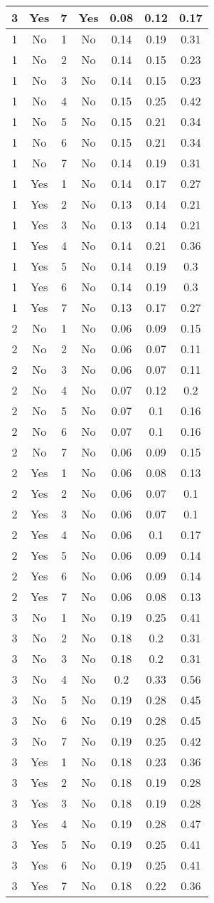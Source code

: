 \begin{table}
\begin{tabular}{|c|c|c|c|c|c|c|}
\hline 
3 & Yes & 7 & Yes & 0.08 & 0.12 & 0.17\tabularnewline
\hline 
1 & No & 1 & No & 0.14 & 0.19 & 0.31\tabularnewline
\hline 
1 & No & 2 & No & 0.14 & 0.15 & 0.23\tabularnewline
\hline 
1 & No & 3 & No & 0.14 & 0.15 & 0.23\tabularnewline
\hline 
1 & No & 4 & No & 0.15 & 0.25 & 0.42\tabularnewline
\hline 
1 & No & 5 & No & 0.15 & 0.21 & 0.34\tabularnewline
\hline 
1 & No & 6 & No & 0.15 & 0.21 & 0.34\tabularnewline
\hline 
1 & No & 7 & No & 0.14 & 0.19 & 0.31\tabularnewline
\hline 
1 & Yes & 1 & No & 0.14 & 0.17 & 0.27\tabularnewline
\hline 
1 & Yes & 2 & No & 0.13 & 0.14 & 0.21\tabularnewline
\hline 
1 & Yes & 3 & No & 0.13 & 0.14 & 0.21\tabularnewline
\hline 
1 & Yes & 4 & No & 0.14 & 0.21 & 0.36\tabularnewline
\hline 
1 & Yes & 5 & No & 0.14 & 0.19 & 0.3\tabularnewline
\hline 
1 & Yes & 6 & No & 0.14 & 0.19 & 0.3\tabularnewline
\hline 
1 & Yes & 7 & No & 0.13 & 0.17 & 0.27\tabularnewline
\hline 
2 & No & 1 & No & 0.06 & 0.09 & 0.15\tabularnewline
\hline 
2 & No & 2 & No & 0.06 & 0.07 & 0.11\tabularnewline
\hline 
2 & No & 3 & No & 0.06 & 0.07 & 0.11\tabularnewline
\hline 
2 & No & 4 & No & 0.07 & 0.12 & 0.2\tabularnewline
\hline 
2 & No & 5 & No & 0.07 & 0.1 & 0.16\tabularnewline
\hline 
2 & No & 6 & No & 0.07 & 0.1 & 0.16\tabularnewline
\hline 
2 & No & 7 & No & 0.06 & 0.09 & 0.15\tabularnewline
\hline 
2 & Yes & 1 & No & 0.06 & 0.08 & 0.13\tabularnewline
\hline 
2 & Yes & 2 & No & 0.06 & 0.07 & 0.1\tabularnewline
\hline 
2 & Yes & 3 & No & 0.06 & 0.07 & 0.1\tabularnewline
\hline 
2 & Yes & 4 & No & 0.06 & 0.1 & 0.17\tabularnewline
\hline 
2 & Yes & 5 & No & 0.06 & 0.09 & 0.14\tabularnewline
\hline 
2 & Yes & 6 & No & 0.06 & 0.09 & 0.14\tabularnewline
\hline 
2 & Yes & 7 & No & 0.06 & 0.08 & 0.13\tabularnewline
\hline 
3 & No & 1 & No & 0.19 & 0.25 & 0.41\tabularnewline
\hline 
3 & No & 2 & No & 0.18 & 0.2 & 0.31\tabularnewline
\hline 
3 & No & 3 & No & 0.18 & 0.2 & 0.31\tabularnewline
\hline 
3 & No & 4 & No & 0.2 & 0.33 & 0.56\tabularnewline
\hline 
3 & No & 5 & No & 0.19 & 0.28 & 0.45\tabularnewline
\hline 
3 & No & 6 & No & 0.19 & 0.28 & 0.45\tabularnewline
\hline 
3 & No & 7 & No & 0.19 & 0.25 & 0.42\tabularnewline
\hline 
3 & Yes & 1 & No & 0.18 & 0.23 & 0.36\tabularnewline
\hline 
3 & Yes & 2 & No & 0.18 & 0.19 & 0.28\tabularnewline
\hline 
3 & Yes & 3 & No & 0.18 & 0.19 & 0.28\tabularnewline
\hline 
3 & Yes & 4 & No & 0.19 & 0.28 & 0.47\tabularnewline
\hline 
3 & Yes & 5 & No & 0.19 & 0.25 & 0.41\tabularnewline
\hline 
3 & Yes & 6 & No & 0.19 & 0.25 & 0.41\tabularnewline
\hline 
3 & Yes & 7 & No & 0.18 & 0.22 & 0.36\tabularnewline
\hline 
\end{tabular}%
\end{table}
%

